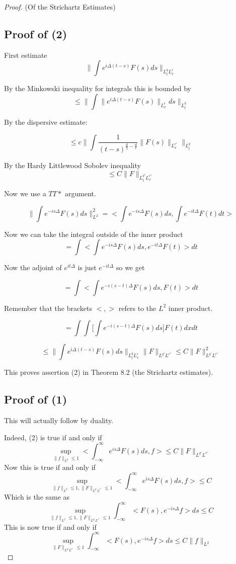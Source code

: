 \documentclass[11pt]{amsart}
\theoremstyle{plain}
\numberwithin{equation}{section}
\theoremstyle{remark}
\begin{document}
\begin{proof} (Of the Strichartz Estimates)
\subsection{Proof of (2)}
First estimate $$\big \| \int e^{i\Delta (t-s)} F(s)ds  \big \|_{L^q_t L^r_x} $$

By the Minkowski inequality for integrals this is bounded by $$\leq \big \| \int \| e^{i\Delta (t-s)} F(s)\|_{L^r_x}ds  \big \|_{L^q_t } $$

By the dispersive estimate: 

$$ \leq c \big \| \int \frac{1}{(t-s)^{\frac{d}{2}-\frac{d}{r}}} \|F(s) \|_{L_x^{r'}}        \big \|_{L^q_t}$$

By the Hardy Littlewood Sobolev inequality $$\leq C \| F \|_{L^{q'}_t L^{r'}_x}$$


Now we use a $TT*$ argument. 

$$ \| \int e^{-is\Delta}F(s) ds \|_{L^2}^2 = \big <  \int e^{-is\Delta} F(s) ds, \int e^{-it\Delta} F(t)dt  \big >$$

Now we can take the integral outside of the inner product
$$ = \int  \big <  \int e^{-is\Delta} F(s) ds,  e^{-it\Delta} F(t)  \big >dt $$

Now the adjoint of $e^{it\Delta}$ is just $e^{-it\Delta}$ so we get

$$ =  \int  \big <  \int e^{-i(s-t)\Delta} F(s) ds, F(t)  \big >dt $$

Remember that the brackets $<,>$ refers to the $L^2$ inner product.

$$=  \int \int  \big [ \int e^{-i(s-t)\Delta} F(s) ds \big  ] F(t) dx dt  $$

$$\leq  \big \| \int e^{i\Delta (t-s)} F(s)ds  \big \|_{L^q_t L^r_x}  \| F \|_{L^{q'}L^{r'}} \leq C \| F \|_{L^{q'}L^{r'}}^2 
 $$

This proves assertion (2) in Theorem 8.2 (the Strichartz estimates).

\subsection{Proof of (1)} This will actually follow by duality. 

Indeed, (2) is true if and only if $$\sup_{\|f\|_{L^2} \leq 1 } \big < \int_{-\infty}^{\infty} e^{is\Delta} F(s)ds , f \big > \leq C \| F\|_{L^{q'}L^{r'}}$$
Now this is true if and only if   $$\sup_{\|f\|_{L^2} \leq 1 , \| F\|_{L^{q'}L^{r'}}\leq 1 } \big < \int_{-\infty}^{\infty} e^{is\Delta} F(s)ds , f \big > \leq C$$
Which is the same as $$\sup_{\|f\|_{L^2} \leq 1 , \| F\|_{L^{q'}L^{r'}}\leq 1 } \int_{-\infty}^{\infty} \big < F(s) , e^{-is\Delta}  f \big >ds \leq C$$
This is now true if and only if   $$\sup_{\| F\|_{L^{q'}L^{r'}}\leq 1 } \int_{-\infty}^{\infty} \big < F(s) , e^{-is\Delta}  f \big >ds \leq C \|f \|_{L^2}$$


\end{proof}
\end{document}
